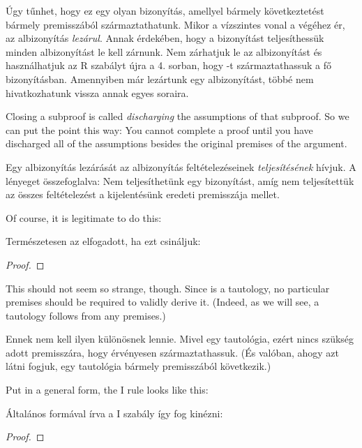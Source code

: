 Úgy tűnhet, hogy ez egy olyan bizonyítás, amellyel bármely  következtetést bármely  premisszából származtathatunk. Mikor a vízszintes vonal a végéhez ér, az albizonyítás \emph{lezárul}. Annak érdekében, hogy a bizonyítást teljesíthessük minden albizonyítást le kell zárnunk. Nem zárhatjuk le az albizonyítást és használhatjuk az R szabályt újra a 4. sorban, hogy -t származtathassuk a fő bizonyításban. Amennyiben már lezártunk egy albizonyítást, többé nem hivatkozhatunk vissza annak egyes soraira.

Closing a subproof is called \emph{discharging} the assumptions of that subproof. So we can put the point this way: You cannot complete a proof until you have discharged all of the assumptions besides the original premises of the argument.

Egy albizonyítás lezárását az albizonyítás feltételezéseinek \emph{teljesítésének} hívjuk. A lényeget összefoglalva: Nem teljesíthetünk egy bizonyítást, amíg nem teljesítettük az összes feltételezést a kijelentésünk eredeti premisszája mellet.

Of course, it is legitimate to do this:

Természetesen az  elfogadott, ha ezt csináljuk:

\begin{proof}
	\open
		 
	\close
	 
\end{proof}

This should not seem so strange, though. Since \eif{} is a tautology, no particular premises should be required to validly derive it. (Indeed, as we will see, a tautology follows from any premises.)

Ennek nem kell ilyen különösnek lennie. Mivel \eif{} egy tautológia, ezért nincs szükség adott premisszára, hogy érvényesen származtathassuk. (És valóban, ahogy azt látni fogjuk, egy tautológia bármely premisszából következik.)

Put in a general form, the {\eif}I rule looks like this:

Általános formával írva a {\eif}I szabály így fog kinézni:

\begin{proof}
	\open
		 
	\close
\end{proof}

